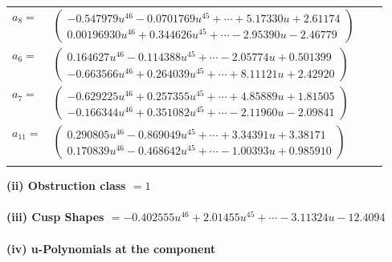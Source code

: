 \documentclass[1p]{elsarticle_modified}
\theoremstyle{definition}
\begin{document}
\begin{tabular}{m{7pt} m{180pt} m{7pt} m{180pt} }
\flushright $a_{8}=$&$\begin{pmatrix}-0.547979 u^{46}-0.0701769 u^{45}+\cdots+5.17330 u+2.61174\\0.00196930 u^{46}+0.344626 u^{45}+\cdots-2.95390 u-2.46779\end{pmatrix}$ \\
\flushright $a_{6}=$&$\begin{pmatrix}0.164627 u^{46}-0.114388 u^{45}+\cdots-2.05774 u+0.501399\\-0.663566 u^{46}+0.264039 u^{45}+\cdots+8.11121 u+2.42920\end{pmatrix}$ \\
\flushright $a_{7}=$&$\begin{pmatrix}-0.629225 u^{46}+0.257355 u^{45}+\cdots+4.85889 u+1.81505\\-0.166344 u^{46}+0.351082 u^{45}+\cdots-2.11960 u-2.09841\end{pmatrix}$ \\
\flushright $a_{11}=$&$\begin{pmatrix}0.290805 u^{46}-0.869049 u^{45}+\cdots+3.34391 u+3.38171\\0.170839 u^{46}-0.468642 u^{45}+\cdots-1.00393 u+0.985910\end{pmatrix}$\\&\end{tabular}
\flushleft \textbf{(ii) Obstruction class $= 1$}\\~\\
\flushleft \textbf{(iii) Cusp Shapes $= -0.402555 u^{46}+2.01455 u^{45}+\cdots-3.11324 u-12.4094$}\\~\\
\newpage\renewcommand{\arraystretch}{1}
\flushleft \textbf{(iv) u-Polynomials at the component}\newline \\
\end{document}
